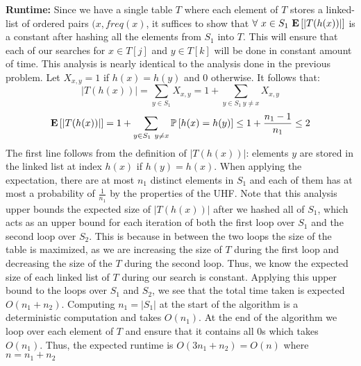 \documentclass[12pt]{article}
\begin{document}
\begin{solution}
\textbf{Runtime:} Since we have a single table $T$ where each element of $T$ stores a linked-list of ordered pairs $(x,freq(x)$, it suffices to show that $\forall~x\in S_1~\mathbf{E}\left[|T(h(x))|\right]$ is a constant after hashing all the elements from $S_1$ into $T$. This will ensure that each of our searches for $x\in T[j]$ and $y\in T[k]$ will be done in constant amount of time. This analysis is nearly identical to the analysis done in the previous problem. Let $X_{x,y}=1$ if $h(x) = h(y)$ and $0$ otherwise. It follows that:
\[
|T(h(x))| = \sum_{y\in S_1}{X_{x,y}} = 1 + \sum_{y\in S_1 ~ y\neq x}{X_{x,y}}
\]
\[
\mathbf{E}\left[|T(h(x))|\right] = 1 + \sum_{y\in S_1 ~ y\neq x}{\mathbb{P}\left[h(x) = h(y)\right]} \leq 1 + \frac{n_1-1}{n_1} \leq 2
\]
The first line follows from the definition of $|T(h(x))|$: elements $y$ are stored in the linked list at index $h(x)$ if $h(y) = h(x)$. When applying the expectation, there are at most $n_1$ distinct elements in $S_1$ and each of them has at most a probability of $\frac{1}{n_1}$ by the properties of the UHF. Note that this analysis upper bounds the expected size of $|T(h(x))|$ after we hashed all of $S_1$, which acts as an upper bound for each iteration of both the first loop over $S_1$ and the second loop over $S_2$. This is because in between the two loops the size of the table is maximized, as we are increasing the size of $T$ during the first loop and decreasing the size of the $T$ during the second loop. Thus, we know the expected size of each linked list of $T$ during our search is constant. Applying this upper bound to the loops over $S_1$ and $S_2$, we see that the total time taken is expected $O(n_1 + n_2)$. Computing $n_1 = |S_1|$ at the start of the algorithm is a deterministic computation and takes $O(n_1)$. At the end of the algorithm we loop over each element of $T$ and ensure that it contains all $0$s which takes $O(n_1)$. Thus, the expected runtime is $O(3n_1 + n_2) = O(n)$ where $n = n_1 + n_2$

\end{solution}
\end{document}
